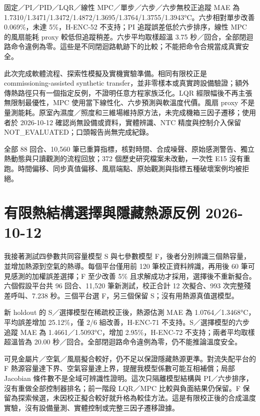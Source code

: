 \documentclass[12pt,a4paper]{article}
\begin{document}
固定／PI／PID／LQR／線性 MPC／單步／六步／六步無校正追蹤 MAE 為 1.7310/1.3471/1.3472/1.4872/1.3695/1.3764/1.3755/1.3943°C。六步相對單步改善 0.069\%，未達 5\%，H-ENC-52 不支持；PI 追蹤誤差低於六步排序，線性 MPC 的風扇能耗 proxy 較低但追蹤稍差。六步平均取樣超溫 3.75 秒／回合，全部閉迴路命令違例為零。這些是不同閉迴路軌跡下的比較；不能把命令合規當成真實安全。


此次完成軟體流程、探索性模擬及實機實驗準備。相同有限校正是 commissioning-assisted synthetic transfer，並非零樣本或真實跨設備驗證；額外傳熱路徑只有一個指定反例，不證明任意方程家族泛化。LQR 經限幅後不再主張無限制最優性，MPC 使用當下線性化、六步預測與軟溫度代價。風扇 proxy 不是量測能耗。原室內濕度／照度和三維場維持原方法，未完成機箱三因子遷移；使用者於 2026-10-12 確認尚無設備或資料，實體辨識、NTC 精度與控制介入保留 NOT\_\allowbreak{}EVALUATED；口頭報告尚無完成紀錄。


全部 88 回合、10,560 筆已重算指標，核對時間、合成噪聲、原始感測警告、獨立熱動態與只讀觀測的流程回放；372 個歷史研究檔案未改動，一次性 E15 沒有重跑。時間偏移、同步真值偏移、風扇端點、原始觀測與指標五種破壞案例均被拒絕。


\section*{有限熱結構選擇與隱藏熱源反例 2026-10-12}

我接著測試四參數共同容量模型 S 與七參數模型 F，後者分別辨識三個熱容量，並增加熱源到空氣的熱導。每個平台僅用前 120 筆校正資料辨識，再用後 60 筆可見感測的加權誤差選擇；F 至少改善 5\% 且求解成功才採用，選擇後不重新擬合。六個假設平台共 96 回合、11,520 筆新測試，校正合計 12 次擬合、993 次完整殘差呼叫、7.238 秒。三個平台選 F，另三個保留 S；沒有用熱源真值選模型。


新 holdout 的 S／選擇模型在稀疏校正後，熱源估測 MAE 為 1.0764／1.3468°C，平均誤差增加 25.12\%，僅 2/6 組改善，H-ENC-71 不支持。S／選擇模型的六步追蹤 MAE 為 1.4661／1.5093°C，增加 2.95\%，H-ENC-72 不支持；兩者平均取樣超溫皆為 20.00 秒／回合。全部閉迴路命令違例為零，仍不能推論溫度安全。


可見金屬片／空氣／風扇擬合較好，仍不足以保證隱藏熱源更準。對流失配平台的 F 熱源容量達下界、空氣容量達上界，提醒我模型係數可能互相補償；局部 Jacobian 條件數不是全域可辨識性證明。這次只隔離模型結構與 PI／六步排序，沒有重做全部控制器排名；前一階段 LQR／MPC 比較與負面結果仍保留。F 保留為探索候選，未因校正擬合較好就升格為較佳方法。這是有限校正後的合成溫度實驗，沒有設備量測、實體控制或完整三因子遷移證據。
\end{document}
